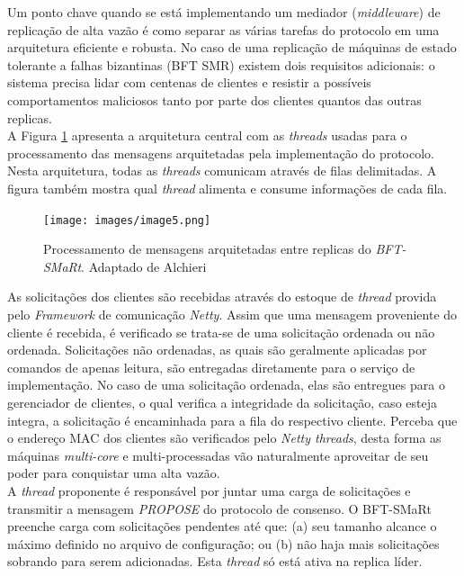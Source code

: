 	Um ponto chave quando se está implementando um mediador (\textit{middleware}) de replicação de alta vazão é como separar as várias tarefas do protocolo em uma arquitetura eficiente e robusta. No caso de uma replicação de máquinas de estado tolerante a falhas bizantinas (BFT SMR) existem dois requisitos adicionais: o sistema precisa lidar com centenas de clientes e resistir a possíveis comportamentos maliciosos tanto por parte dos clientes quantos das outras replicas.\\
	
	A Figura \ref{fig:image5} apresenta a arquitetura central com as \textit{threads}  usadas para o processamento das mensagens arquitetadas pela implementação do protocolo. Nesta arquitetura, todas as \textit{threads} comunicam através de filas delimitadas. A figura também mostra qual \textit{thread} alimenta e consume informações de cada fila. \\  
	
	\begin{figure}[htb]
		\begin{center}
			
			\texttt{[image: images/image5.png]}
			\caption{Processamento de mensagens arquitetadas entre replicas do \textit{BFT-SMaRt}. Adaptado de Alchieri~\cite{bessani3} }
			\label{fig:image5}
		\end{center}
	\end{figure}
	
	As solicitações dos clientes são recebidas através do estoque de \textit{thread} provida pelo \textit{Framework} de comunicação \textit{Netty}. Assim que uma mensagem proveniente do cliente é recebida, é verificado se trata-se de uma solicitação ordenada ou não ordenada. Solicitações não ordenadas, as quais são geralmente aplicadas por comandos de apenas leitura, são entregadas diretamente para o serviço de implementação. No caso de uma solicitação ordenada, elas são entregues para o gerenciador de clientes, o qual verifica a integridade da solicitação, caso esteja integra, a solicitação é encaminhada para a fila do respectivo cliente. Perceba que o endereço MAC dos clientes são verificados pelo \textit{Netty threads}, desta forma as máquinas \textit{multi-core} e multi-processadas vão naturalmente aproveitar de seu poder para conquistar uma alta vazão. \\ 
	
	A \textit{thread} proponente é responsável por juntar uma carga de solicitações e transmitir a mensagem \textit{PROPOSE} do protocolo de consenso. O BFT-SMaRt preenche carga com solicitações pendentes até que: (a) seu tamanho alcance o máximo definido no arquivo de configuração; ou (b) não haja mais solicitações sobrando para serem adicionadas. Esta \textit{thread} só está ativa na replica líder. \\
	
